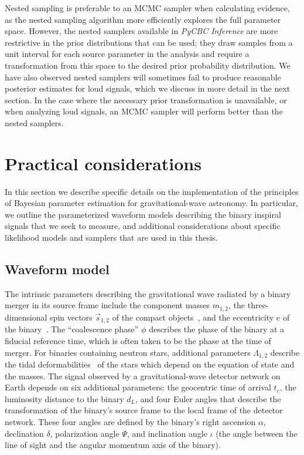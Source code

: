 Nested sampling is preferable to an MCMC sampler when calculating evidence, as the nested sampling algorithm more efficiently explores the full parameter space. However, the nested samplers available in \textit{PyCBC Inference} are more restrictive in the prior distributions that can be used; they draw samples from a unit interval for each source parameter in the analysis and require a transformation from this space to the desired prior probability distribution. We have also observed nested samplers will sometimes fail to produce reasonable posterior estimates for loud signals, which we discuss in more detail in the next section. In the case where the necessary prior transformation is unavailable, or when analyzing loud signals, an MCMC sampler will perform better than the nested samplers.


\section{Practical considerations}
In this section we describe specific details on the implementation of the principles of Bayesian parameter estimation for gravitational-wave astronomy. In particular, we outline the parameterized waveform models describing the binary inspiral signals that we seek to measure, and additional considerations about specific likelihood models and samplers that are used in this thesis.

\subsection{Waveform model}
The intrinsic parameters describing the gravitational wave radiated by a binary merger in its source frame include the component masses $m_{1,2}$, the three-dimensional spin vectors $\vec{s}_{1,2}$ of the compact objects~\cite{Hawking:1987en}, and the eccentricity $e$ of the binary~\cite{Peters:1964zz}. The ``coalescence phase'' $\phi$ describes the phase of the binary at a fiducial reference time, which is often taken to be the phase at the time of merger. For binaries containing neutron stars, additional parameters $\Lambda_{1,2}$ describe the tidal deformabilities~\cite{Flanagan:2007ix,Hinderer:2007mb} of the stars which depend on the equation of state and the masses. The signal observed by a gravitational-wave detector network on Earth depends on six additional parameters: the geocentric time of arrival $t_c$, the luminosity distance to the binary $d_L$, and four Euler angles that describe the transformation of the binary's source frame to the local frame of the detector network. These four angles are defined by the binary's right ascension $\alpha$, declination $\delta$, polarization angle $\Psi$, and inclination angle $\iota$ (the angle between the line of sight and the angular momentum axis of the binary).

